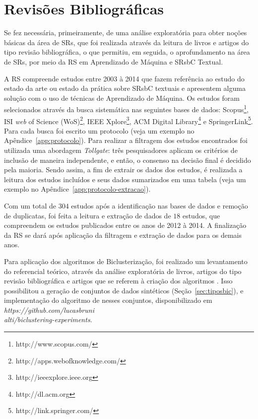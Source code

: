 \documentclass[
    12pt,                %
    oneside,            %
    a4paper,            %
    english,            %
    brazil                %
    ]{abntex2ppgsi}
\begin{document}
\section{Revisões Bibliográficas}
\label{sec:revisoesbibliograficas}

Se fez necessária, primeiramente, de uma análise exploratória para obter noções básicas da área de SRs, que foi realizada através da leitura de livros e artigos do tipo revisão bibliográfica, o que permitiu, em seguida, o aprofundamento na área de SRs, por meio da RS em Aprendizado de Máquina e SRsbC Textual.

A RS compreende estudos entre 2003 à 2014 que fazem referência ao estudo do estado da arte ou estado da prática sobre SRsbC textuais e apresentem alguma solução com o uso de técnicas de Aprendizado de Máquina.
Os estudos foram selecionados através da busca sistemática nas seguintes bases de dados: Scopus\footnote{http://www.scopus.com/}, ISI \textit{web} of Science (WoS)\footnote{http://apps.webofknowledge.com/}, IEEE Xplore\footnote{http://ieeexplore.ieee.org}, ACM Digital Library\footnote{http://dl.acm.org} e SpringerLink\footnote{http://link.springer.com/}. Para cada busca foi escrito um protocolo (veja um exemplo no Apêndice~\ref{app:protocolo}).
Para realizar a filtragem dos estudos encontrados foi utilizada uma abordagem \textit{Tollgate}: três pesquisadores aplicam os critérios de inclusão de maneira independente, e então, o consenso na decisão final é decidido pela maioria.
Sendo assim, a fim de extrair os dados dos estudos, é realizada a leitura dos estudos incluídos e seus dados sumarizados em uma tabela (veja um exemplo no Apêndice~\ref{app:protocolo-extracao}).

Com um total de $304$ estudos após a identificação nas bases de dados e remoção de duplicatas, foi feita a leitura e extração de dados de $18$ estudos, que compreendem os estudos publicados entre os anos de 2012 à 2014. A finalização da RS se dará após aplicação da filtragem e extração de dados para os demais anos.

Para aplicação dos algoritmos de Biclusterização, foi realizado um levantamento do referencial teórico, através da análise exploratória de livros, artigos do tipo revisão bibliográfica e artigos que se referem à criação dos algoritmos \cite{Franca2010,Cheng2000,Tanay2005,Madeira2004,Santamaria2007,Kluger2003,Prelic2006}.
Isso possibilitou a geração de conjuntos de dados sintéticos (Seção~\ref{sec:tiposbic}), e implementação do algoritmo de  nesses conjuntos, disponibilizado em \textit{https://github.com/lucasbruni\\alti/biclustering-experiments}.
\end{document}
